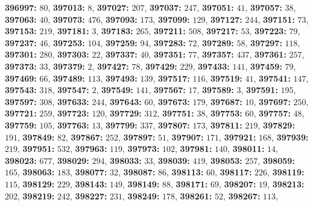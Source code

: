 \textsf{\bfseries 396997:} $80$, \textsf{\bfseries 397013:} $8$, \textsf{\bfseries 397027:} $207$, \textsf{\bfseries 397037:} $247$, \textsf{\bfseries 397051:} $41$, \textsf{\bfseries 397057:} $38$, \textsf{\bfseries 397063:} $40$, \textsf{\bfseries 397073:} $476$, \textsf{\bfseries 397093:} $173$, \textsf{\bfseries 397099:} $129$, \textsf{\bfseries 397127:} $244$, \textsf{\bfseries 397151:} $73$, \textsf{\bfseries 397153:} $219$, \textsf{\bfseries 397181:} $3$, \textsf{\bfseries 397183:} $265$, \textsf{\bfseries 397211:} $508$, \textsf{\bfseries 397217:} $53$, \textsf{\bfseries 397223:} $79$, \textsf{\bfseries 397237:} $46$, \textsf{\bfseries 397253:} $104$, \textsf{\bfseries 397259:} $94$, \textsf{\bfseries 397283:} $72$, \textsf{\bfseries 397289:} $58$, \textsf{\bfseries 397297:} $118$, \textsf{\bfseries 397301:} $280$, \textsf{\bfseries 397303:} $22$, \textsf{\bfseries 397337:} $40$, \textsf{\bfseries 397351:} $77$, \textsf{\bfseries 397357:} $437$, \textsf{\bfseries 397361:} $257$, \textsf{\bfseries 397373:} $33$, \textsf{\bfseries 397379:} $2$, \textsf{\bfseries 397427:} $78$, \textsf{\bfseries 397429:} $229$, \textsf{\bfseries 397433:} $141$, \textsf{\bfseries 397459:} $79$, \textsf{\bfseries 397469:} $66$, \textsf{\bfseries 397489:} $113$, \textsf{\bfseries 397493:} $139$, \textsf{\bfseries 397517:} $116$, \textsf{\bfseries 397519:} $41$, \textsf{\bfseries 397541:} $147$, \textsf{\bfseries 397543:} $318$, \textsf{\bfseries 397547:} $2$, \textsf{\bfseries 397549:} $141$, \textsf{\bfseries 397567:} $17$, \textsf{\bfseries 397589:} $3$, \textsf{\bfseries 397591:} $195$, \textsf{\bfseries 397597:} $308$, \textsf{\bfseries 397633:} $244$, \textsf{\bfseries 397643:} $60$, \textsf{\bfseries 397673:} $179$, \textsf{\bfseries 397687:} $10$, \textsf{\bfseries 397697:} $250$, \textsf{\bfseries 397721:} $259$, \textsf{\bfseries 397723:} $120$, \textsf{\bfseries 397729:} $312$, \textsf{\bfseries 397751:} $38$, \textsf{\bfseries 397753:} $60$, \textsf{\bfseries 397757:} $48$, \textsf{\bfseries 397759:} $105$, \textsf{\bfseries 397763:} $13$, \textsf{\bfseries 397799:} $337$, \textsf{\bfseries 397807:} $173$, \textsf{\bfseries 397811:} $219$, \textsf{\bfseries 397829:} $191$, \textsf{\bfseries 397849:} $82$, \textsf{\bfseries 397867:} $252$, \textsf{\bfseries 397897:} $51$, \textsf{\bfseries 397907:} $171$, \textsf{\bfseries 397921:} $168$, \textsf{\bfseries 397939:} $219$, \textsf{\bfseries 397951:} $532$, \textsf{\bfseries 397963:} $119$, \textsf{\bfseries 397973:} $102$, \textsf{\bfseries 397981:} $140$, \textsf{\bfseries 398011:} $14$, \textsf{\bfseries 398023:} $677$, \textsf{\bfseries 398029:} $294$, \textsf{\bfseries 398033:} $33$, \textsf{\bfseries 398039:} $419$, \textsf{\bfseries 398053:} $257$, \textsf{\bfseries 398059:} $165$, \textsf{\bfseries 398063:} $183$, \textsf{\bfseries 398077:} $32$, \textsf{\bfseries 398087:} $86$, \textsf{\bfseries 398113:} $60$, \textsf{\bfseries 398117:} $226$, \textsf{\bfseries 398119:} $115$, \textsf{\bfseries 398129:} $229$, \textsf{\bfseries 398143:} $149$, \textsf{\bfseries 398149:} $88$, \textsf{\bfseries 398171:} $69$, \textsf{\bfseries 398207:} $19$, \textsf{\bfseries 398213:} $202$, \textsf{\bfseries 398219:} $242$, \textsf{\bfseries 398227:} $231$, \textsf{\bfseries 398249:} $178$, \textsf{\bfseries 398261:} $52$, \textsf{\bfseries 398267:} $113$, 
